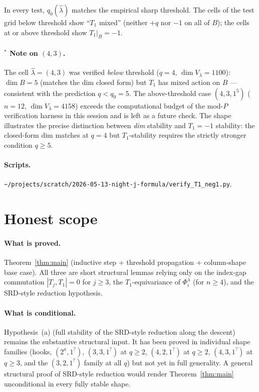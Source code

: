 \documentclass[11pt]{article}
\theoremstyle{definition}
\begin{document}
In every test, $q_0(\hat\lambda)$ matches the empirical sharp
threshold. The cells of the test grid below threshold show
``$T_1$ mixed'' (neither $+q$ nor $-1$ on all of $B$); the cells at
or above threshold show $T_1 |_B = -1$.

\paragraph{${}^*$ Note on $(4, 3)$.} The cell $\hat\lambda = (4, 3)$
was verified \emph{below} threshold ($q = 4$, $\dim V_\lambda = 1100$):
$\dim B = 5$ (matches the dim closed form) but $T_1$ has mixed action
on $B$ --- consistent with the prediction $q < q_0 = 5$. The
above-threshold case $(4, 3, 1^5)$ ($n = 12$, $\dim V_\lambda = 4158$)
exceeds the computational budget of the mod-$P$ verification harness
in this session and is left as a future check. The shape illustrates
the precise distinction between \emph{dim} stability and
$T_1 = -1$ stability: the closed-form dim matches at $q = 4$ but
$T_1$-stability requires the strictly stronger condition $q \ge 5$.

\paragraph{Scripts.}
\texttt{\textasciitilde/projects/scratch/2026-05-13-night-j-formula/verify\_T1\_neg1.py}.

\section{Honest scope}\label{sec:scope}

\paragraph{What is proved.}
Theorem~\ref{thm:main} (inductive step + threshold propagation +
column-shape base case). All three are short structural lemmas
relying only on the index-gap commutation
$|T_j, T_1| = 0$ for $j \ge 3$, the $T_1$-equivariance of
$\Phi_i^\lambda$ (for $n \ge 4$), and the SRD-style reduction
hypothesis.

\paragraph{What is conditional.}
Hypothesis~(a) (full stability of the SRD-style reduction along the
descent) remains the substantive structural input. It has been proved
in individual shape families (hooks, $(2^a, 1^?)$, $(3, 3, 1^?)$ at
$q \ge 2$, $(4, 2, 1^?)$ at $q \ge 2$, $(4, 3, 1^?)$ at $q \ge 3$, and
the $(3, 2, 1^?)$ family at all $q$) but not yet in full generality.
A general structural proof of SRD-style reduction would render
Theorem~\ref{thm:main} unconditional in every fully stable shape.
\end{document}
